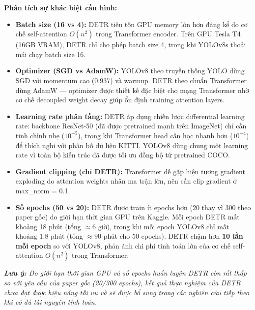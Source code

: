\textbf{Phân tích sự khác biệt cấu hình:}
\begin{itemize}
	\item \textbf{Batch size (16 vs 4):} DETR tiêu tốn GPU memory lớn hơn đáng kể do cơ chế self-attention $O(n^2)$ trong Transformer encoder. Trên GPU Tesla T4 (16GB VRAM), DETR chỉ cho phép batch size 4, trong khi YOLOv8s thoải mái chạy batch size 16.
	\item \textbf{Optimizer (SGD vs AdamW):} YOLOv8 theo truyền thống YOLO dùng SGD với momentum cao (0.937) và warmup. DETR theo chuẩn Transformer dùng AdamW --- optimizer được thiết kế đặc biệt cho mạng Transformer nhờ cơ chế decoupled weight decay giúp ổn định training attention layers.
	\item \textbf{Learning rate phân tầng:} DETR áp dụng chiến lược differential learning rate: backbone ResNet-50 (đã được pretrained mạnh trên ImageNet) chỉ cần tinh chỉnh nhẹ ($10^{-5}$), trong khi Transformer head cần học nhanh hơn ($10^{-4}$) để thích nghi với phân bố dữ liệu KITTI. YOLOv8 dùng chung một learning rate vì toàn bộ kiến trúc đã được tối ưu đồng bộ từ pretrained COCO.
	\item \textbf{Gradient clipping (chỉ DETR):} Transformer dễ gặp hiện tượng gradient exploding do attention weights nhân ma trận lớn, nên cần clip gradient ở max\_norm = 0.1.
	\item \textbf{Số epochs (50 vs 20):} DETR được train ít epochs hơn (20 thay vì 300 theo paper gốc) do giới hạn thời gian GPU trên Kaggle. Mỗi epoch DETR mất khoảng 18 phút (tổng $\approx 6$ giờ), trong khi mỗi epoch YOLOv8 chỉ mất khoảng 1.8 phút (tổng $\approx 90$ phút cho 50 epochs). DETR chậm hơn \textbf{10 lần mỗi epoch} so với YOLOv8, phản ánh chi phí tính toán lớn của cơ chế self-attention $O(n^2)$ trong Transformer.
\end{itemize}

\textit{\textbf{Lưu ý:} Do giới hạn thời gian GPU và số epochs huấn luyện DETR còn rất thấp so với yêu cầu của paper gốc (20/300 epochs), kết quả thực nghiệm của DETR chưa đạt được hiệu năng tối ưu và sẽ được bổ sung trong các nghiên cứu tiếp theo khi có đủ tài nguyên tính toán.}
